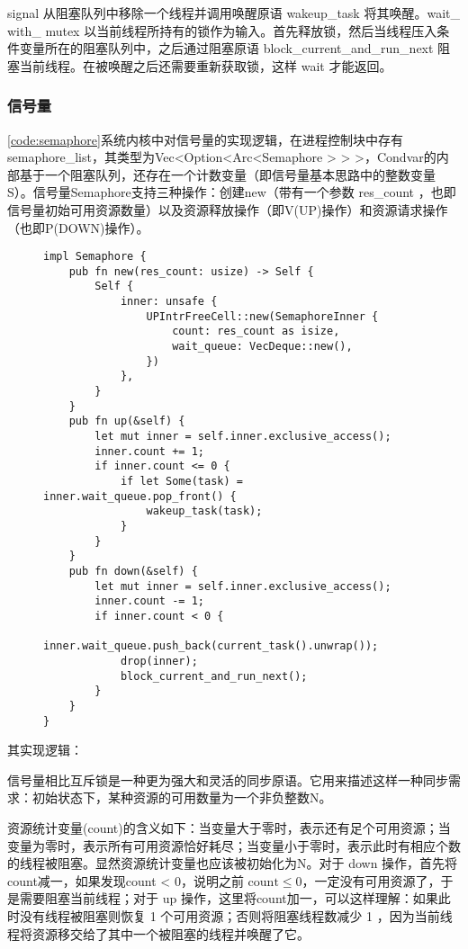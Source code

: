 signal 从阻塞队列中移除一个线程并调用唤醒原语 wakeup\_task 将其唤醒。wait\_ with\_ mutex 以当前线程所持有的锁作为输入。首先释放锁，然后当线程压入条件变量所在的阻塞队列中，之后通过阻塞原语 block\_current\_and\_run\_next 阻塞当前线程。在被唤醒之后还需要重新获取锁，这样 wait 才能返回。

\subsubsection{信号量}

\autoref{code:semaphore}系统内核中对信号量的实现逻辑，在进程控制块中存有semaphore\_list，其类型为Vec<Option<Arc<Semaphore > > >，Condvar的内部基于一个阻塞队列，还存在一个计数变量（即信号量基本思路中的整数变量S）。信号量Semaphore支持三种操作：创建new（带有一个参数 res\_count ，也即信号量初始可用资源数量）以及资源释放操作（即V(UP)操作）和资源请求操作（也即P(DOWN)操作）。
\begin{figure}[h]
\begin{lstlisting}[caption=实现相应的PV操作, label=code:semaphore]
impl Semaphore {
    pub fn new(res_count: usize) -> Self {
        Self {
            inner: unsafe {
                UPIntrFreeCell::new(SemaphoreInner {
                    count: res_count as isize,
                    wait_queue: VecDeque::new(),
                })
            },
        }
    }
    pub fn up(&self) {
        let mut inner = self.inner.exclusive_access();
        inner.count += 1;
        if inner.count <= 0 {
            if let Some(task) = inner.wait_queue.pop_front() {
                wakeup_task(task);
            }
        }
    }
    pub fn down(&self) {
        let mut inner = self.inner.exclusive_access();
        inner.count -= 1;
        if inner.count < 0 {
            inner.wait_queue.push_back(current_task().unwrap());
            drop(inner);
            block_current_and_run_next();
        }
    }
}
\end{lstlisting}
\end{figure}

其实现逻辑：

信号量相比互斥锁是一种更为强大和灵活的同步原语。它用来描述这样一种同步需求：初始状态下，某种资源的可用数量为一个非负整数$\boldsymbol{\mathrm{N}}$。

资源统计变量(count)的含义如下：当变量大于零时，表示还有足个可用资源；当变量为零时，表示所有可用资源恰好耗尽；当变量小于零时，表示此时有相应个数的线程被阻塞。显然资源统计变量也应该被初始化为$\boldsymbol{\mathrm{N}}$。对于 down 操作，首先将 count减一，如果发现count < 0，说明之前 $\mathrm{count} \le 0$，一定没有可用资源了，于是需要阻塞当前线程；对于 up 操作，这里将count加一，可以这样理解：如果此时没有线程被阻塞则恢复 1 个可用资源；否则将阻塞线程数减少 1 ，因为当前线程将资源移交给了其中一个被阻塞的线程并唤醒了它。

